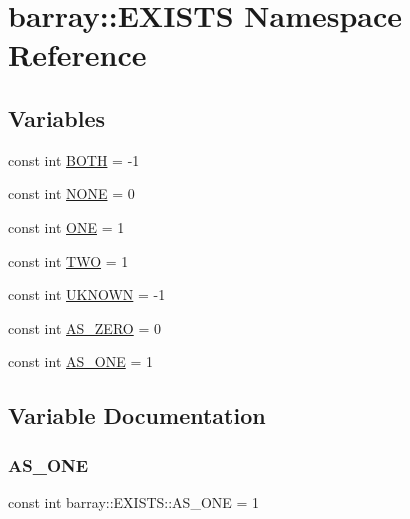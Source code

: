 \hypertarget{namespacebarray_1_1_e_x_i_s_t_s}{}\section{barray\+:\+:E\+X\+I\+S\+TS Namespace Reference}
\label{namespacebarray_1_1_e_x_i_s_t_s}
\subsection*{Variables}
\begin{DoxyCompactItemize}
\item 
const int \hyperlink{namespacebarray_1_1_e_x_i_s_t_s_afe85a112b13fde9e8e9b779aea9db683}{B\+O\+TH} = -\/1
\item 
const int \hyperlink{namespacebarray_1_1_e_x_i_s_t_s_af33c4d6f29c07670c2e9a281fc3e9454}{N\+O\+NE} = 0
\item 
const int \hyperlink{namespacebarray_1_1_e_x_i_s_t_s_a5b0bc4fdec774c35c0bdc562a1239c64}{O\+NE} = 1
\item 
const int \hyperlink{namespacebarray_1_1_e_x_i_s_t_s_aa624d3f524592c728ed5317721a6fff5}{T\+WO} = 1
\item 
const int \hyperlink{namespacebarray_1_1_e_x_i_s_t_s_a50535f647e32d36f4a890267c94b9ec5}{U\+K\+N\+O\+WN} = -\/1
\item 
const int \hyperlink{namespacebarray_1_1_e_x_i_s_t_s_a6d73facc9d247c1186bb425541a16988}{A\+S\+\_\+\+Z\+E\+RO} = 0
\item 
const int \hyperlink{namespacebarray_1_1_e_x_i_s_t_s_a5237a8f5f8d64747b1480cfd3b693967}{A\+S\+\_\+\+O\+NE} = 1
\end{DoxyCompactItemize}


\subsection{Variable Documentation}
\mbox{\label{namespacebarray_1_1_e_x_i_s_t_s_a5237a8f5f8d64747b1480cfd3b693967}} 
\subsubsection{\texorpdfstring{A\+S\+\_\+\+O\+NE}{AS\_ONE}}
{\footnotesize\ttfamily const int barray\+::\+E\+X\+I\+S\+T\+S\+::\+A\+S\+\_\+\+O\+NE = 1}




